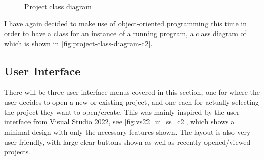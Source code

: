         \begin{figure}[!ht]
            \centering
            \caption{Project class diagram}
            \label{fig:project-class-diagram-c2}
        \end{figure}

        I have again decided to make use of object-oriented programming this time in order to have a class for an instance of a running program, a class diagram of which is shown in \autoref{fig:project-class-diagram-c2}.

    \subsection{User Interface} 


        

        There will be three user-interface menus covered in this section, one for where the user decides to open a new or existing project, and one each for actually selecting the project they want to open/create. 
        This was mainly inspired by the user-interface from Visual Studio 2022, see \autoref{fig:vs22_ui_ss_c2}, which shows a minimal design with only the necessary features shown.
        The layout is also very user-friendly, with large clear buttons shown as well as recently opened/viewed projects.

